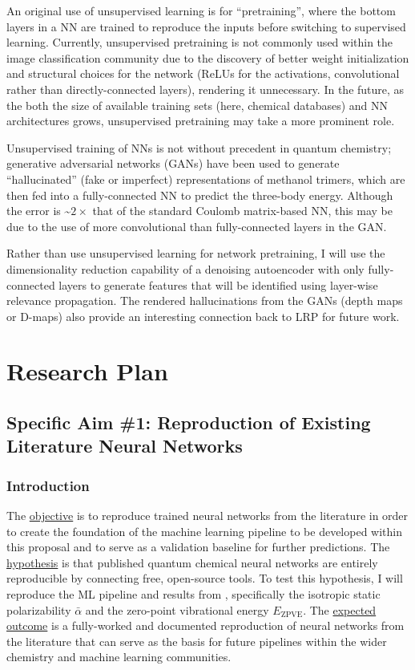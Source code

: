 \documentclass[12pt]{article}
\begin{document}
An original use of unsupervised learning is for ``pretraining'', where the bottom layers in a NN are trained to reproduce the inputs before switching to supervised learning. Currently, unsupervised pretraining is not commonly used within the image classification community due to the discovery of better weight initialization and structural choices for the network (ReLUs for the activations, convolutional rather than directly-connected layers), rendering it unnecessary. In the future, as the both the size of available training sets (here, chemical databases) and NN architectures grows, unsupervised pretraining may take a more prominent role.

Unsupervised training of NNs is not without precedent in quantum chemistry; generative adversarial networks (GANs) have been used to generate ``hallucinated'' (fake or imperfect) representations of methanol trimers, which are then fed into a fully-connected NN to predict the three-body energy\cite{doi:10.1063/1.4973380}. Although the error is \textasciitilde{}\(2\times\) that of the standard Coulomb matrix-based NN, this may be due to the use of more convolutional than fully-connected layers in the GAN.

Rather than use unsupervised learning for network pretraining, I will use the dimensionality reduction capability of a denoising autoencoder\cite{VincentPLarochelleH2008} with only fully-connected layers to generate features that will be identified using layer-wise relevance propagation. The rendered hallucinations from the GANs (depth maps or D-maps) also provide an interesting connection back to LRP for future work.

\section{Research Plan}
\label{sec:orgc3bbd6a}

\subsection{Specific Aim \#1: Reproduction of Existing Literature Neural Networks}
\label{sec:orgea6f58b}

\subsubsection{Introduction}
\label{sec:orgb33db16}

The \uline{objective} is to reproduce trained neural networks from the literature in order to create the foundation of the machine learning pipeline to be developed within this proposal and to serve as a validation baseline for further predictions. The \uline{hypothesis} is that published quantum chemical neural networks are entirely reproducible by connecting free, open-source tools. To test this hypothesis, I will reproduce the ML pipeline and results from \parencite{2017arXiv170205532F}, specifically the isotropic static polarizability \(\bar{\alpha}\) and the zero-point vibrational energy \(E_{\text{ZPVE}}\). The \uline{expected outcome} is a fully-worked and documented reproduction of neural networks from the literature that can serve as the basis for future pipelines within the wider chemistry and machine learning communities.
\end{document}

